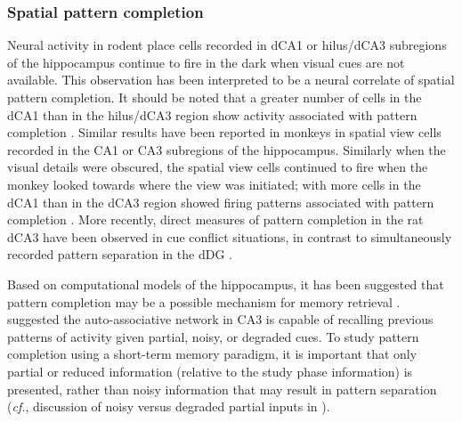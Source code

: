 \documentclass[doc, longtable]{apa6}
\begin{document}
\subsubsection{Spatial pattern completion}
Neural activity in rodent place cells recorded in dCA1 or hilus/dCA3 subregions of the hippocampus continue to fire in the dark when visual cues are not available. This observation has been interpreted to be a neural correlate of spatial pattern completion. It should be noted that a greater number of cells in the dCA1 than in the hilus/dCA3 region show activity associated with pattern completion \parencite{Mizumori1999a}. Similar results have been reported in monkeys in spatial view cells recorded in the CA1 or CA3 subregions of the hippocampus. Similarly when the visual details were obscured, the spatial view cells continued to fire when the monkey looked towards where the view was initiated; with more cells in the dCA1 than in the dCA3 region showed firing patterns associated with pattern completion \parencite{Rolls1998a}. More recently, direct measures of pattern completion in the rat dCA3 have been observed in cue conflict situations, in contrast to simultaneously recorded pattern separation in the dDG \parencite{Neunuebel2014a, Lee2004d}.

Based on computational models of the hippocampus, it has been suggested that pattern completion may be a possible mechanism for memory retrieval \parencite{Rolls1996a, OReilly2001a}. \textcite{Rolls1996a} suggested the auto-associative network in CA3 is capable of recalling previous patterns of activity given partial, noisy, or degraded cues. To study pattern completion using a short-term memory paradigm, it is important that only partial or reduced information (relative to the study phase information) is presented, rather than noisy information that may result in pattern separation (\textit{cf.}, discussion of noisy versus degraded partial inputs in \cite{hunsaker2013operation}). 
\end{document}
